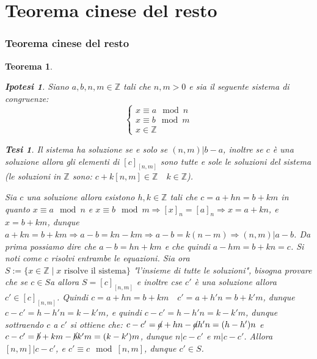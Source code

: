 \documentclass{article}
\makeatletter
\renewenvironment{proof}[1][\proofname]{\par
    \pushQED{\qed}%
    \normalfont \topsep6\p@\@plus6\p@\relax
    \trivlist
    \item\relax
    {\itshape
    #1\@addpunct{.}}\hspace\labelsep\ignorespaces
    }{%
    \popQED\endtrivlist\@endpefalse
}
\newtheorem{theorem}{Teorema}[part]
\newtheorem{ipothesis}[lemma]{Ipotesi}
\newtheorem{thesis}[lemma]{Tesi}
\theoremstyle{definition}
\newcommand{\Z}{\mathbb{Z}}
\makeatother
\begin{document}
\part{Teorema cinese del resto}
\section{Teorema cinese del resto}
\begin{theorem}
    \begin{ipothesis}
        Siano \(a,b,n,m\in\mathbb{Z}\) tali che \(n,m>0\) e sia il seguente sistema di congruenze:
        \[
            \begin{cases}
                x\equiv a\mod n\\
                x\equiv b\mod m\\
                x\in\mathbb{Z}
            \end{cases}
        \]
    \end{ipothesis}
    \begin{thesis}
        Il sistema ha soluzione se e solo se \((n,m)|b-a\), inoltre se \(c\) è una soluzione allora gli elementi di \([c]_{[n,m]}\) sono tutte e sole le soluzioni del sistema (le soluzioni in \(\mathbb{Z}\) sono: \( c+k[n,m]\in\Z\quad k\in\Z \)).
    \end{thesis}
    \begin{proof}
        Sia \(c\) una soluzione allora esistono \(h,k\in\Z\) tali che \(c=a+hn=b+km\) in quanto \(x\equiv a\mod n\) e \(x\equiv b\mod m\Rightarrow [x]_n=[a]_n\Rightarrow x=a+kn\), e \(x=b+km\), dunque \(a+kn=b+km\Rightarrow a-b=kn-km\Rightarrow a-b=k(n-m)\Rightarrow (n,m)|a-b\).
        Da prima possiamo dire che \(a-b = hn+km\) e che quindi \(a-hm=b+kn=c\). Si noti come \(c\) risolvi entrambe le equazioni.
        Sia ora \(S:=\{x\in\Z \mid x\text{ risolve il sistema}\}\) "l'insieme di tutte le soluzioni", bisogna provare che se \(c\in S\)a allora  \(S=[c]_{[n,m]}\) e inoltre cse \(c'\) è una soluzione allora \(c'\in[c]_{[n,m]}\).
        Quindi \(c=a+hn=b+km\quad c'=a+h'n=b+k'm\), dunque \(c-c'=h-h'n=k-k'm\), e quindi \(c-c'=h-h'n=k-k'm\), dunque sottraendo \(c\) a \(c'\) si ottiene che: \(c-c' = \cancel{a}+hn-\cancel{a}h'n=(h-h')n\) e \(c-c' = \cancel{b}+km-\cancel{b}k'm=(k-k')m\), dunque \(n|c-c'\) e \(m|c-c'\). Allora \([n,m] | c-c'\), e \(c'\equiv c\mod [n,m]\), dunque \(c'\in S\).
    \pushQED{}
    \end{proof}
    \raggedleft{{\ensuremath{\blacksquare}}}
\end{theorem}
\end{document}
